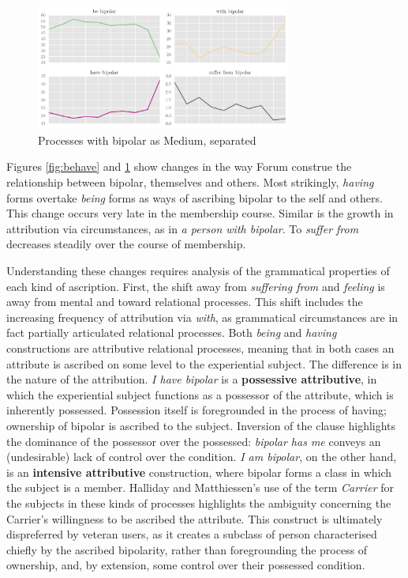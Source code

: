   \begin{figure}[htb]
  \begin{center}
  \includegraphics[width=0.75\textwidth]{../images/being_having_subplots.png}
  \end{center}
  \caption{Processes with bipolar as Medium, separated}
  \label{fig:behave_subplot}
  \end{figure}

Figures \ref{fig:behave} and \ref{fig:behave_subplot} show changes in the way \gls{Forum}  construe the relationship between bipolar, themselves and others. Most strikingly, \emph{having} forms overtake \emph{being} forms as ways of ascribing \gls{bipolar} to the self and others. This change occurs very late in the membership course. Similar is the growth in attribution via circumstances, as in \emph{a person with bipolar}. To \emph{suffer from}  decreases steadily over the course of membership.

Understanding these changes requires analysis of the grammatical properties of each kind of ascription. First, the shift away from \emph{suffering from} and \emph{feeling} is away from mental and toward relational processes. This shift includes the increasing frequency of attribution via \emph{with}, as grammatical circumstances are in fact partially articulated relational processes. Both \emph{being} and \emph{having} constructions are attributive relational processes, meaning that in both cases an attribute is ascribed on some level to the experiential subject. The difference is in the nature of the attribution. \emph{I have bipolar} is a \textbf{possessive attributive}, in which the experiential subject functions as a possessor of the attribute, which is inherently possessed. Possession itself is foregrounded in the process of having; ownership of bipolar is ascribed to the subject. Inversion of the clause highlights the dominance of the possessor over the possessed: \emph{bipolar has me} conveys an (undesirable) lack of control over the condition. \emph{I am bipolar}, on the other hand, is an \textbf{intensive attributive} construction, where bipolar forms a class in which the subject is a member. Halliday and Matthiessen's \citeyear{halliday_introduction_2004} use of the term \emph{Carrier} for the subjects in these kinds of processes highlights the ambiguity concerning the Carrier's willingness to be ascribed the attribute. This construct is ultimately dispreferred by veteran users, as it creates a subclass of person characterised chiefly by the ascribed bipolarity, rather than foregrounding the process of ownership, and, by extension, some control over their possessed condition.

